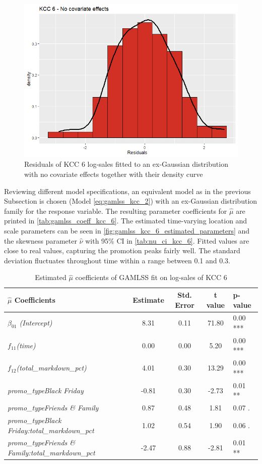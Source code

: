 \begin{figure}[H]
\centering
  \includegraphics[width=0.45\linewidth]{figures/res_kcc_6_no_covariates.png}
  \caption{Residuals of KCC 6 log-sales fitted to an ex-Gaussian distribution with no covariate effects together with their density curve}
  \label{fig:res_kcc_6_no_covariates}
\end{figure}


Reviewing different model specifications, an equivalent model as in the previous Subsection is chosen (Model \ref{eq:gamlss_kcc_2}) with an ex-Gaussian distribution family for the response variable. The resulting parameter coefficients for $\hat{\mu}$ are printed in \autoref{tab:gamlss_coeff_kcc_6}.
The estimated time-varying location and scale parameters can be seen in \autoref{fig:gamlss_kcc_6_estimated_parameters} and the skewness parameter $\hat{\nu}$ with 95\% CI in \autoref{tab:nu_ci_kcc_6}. Fitted values are close to real values, capturing the promotion peaks fairly well. The standard deviation fluctuates throughout time within a range between 0.1 and 0.3.
\\





\begin{table}[H]
\centering
\begin{tabular}{l|c|c|c|l}
  \hline
  \rowcolor{white}
 \textbf{$\hat{\mu}$ Coefficients} & \textbf{Estimate} & \textbf{Std. Error} & \textbf{t value} & \textbf{p-value} \\ 
  \hline\hline
\textit{$\beta_{01}$ (Intercept)} & 8.31 & 0.11 & 71.80 & 0.00 *** \\ 
  \textit{$f_{11}$(time)} & 0.00 & 0.00 & 5.20 & 0.00 *** \\ 
  \textit{$f_{12}$(total\_markdown\_pct)} & 4.01 & 0.30 & 13.29 & 0.00 *** \\ 
  \textit{promo\_typeBlack Friday} & -0.81 & 0.30 & -2.73 & 0.01 ** \\ 
  \textit{promo\_typeFriends \& Family} & 0.87 & 0.48 & 1.81 & 0.07 . \\ 
  \textit{promo\_typeBlack Friday:total\_markdown\_pct} & 1.02 & 0.54 & 1.90 & 0.06 . \\ 
  \textit{promo\_typeFriends \& Family:total\_markdown\_pct} & -2.47 & 0.88 & -2.81 & 0.01 ** \\ \hline
\end{tabular}
\caption{Estimated $\hat{\mu}$ coefficients of \ac{GAMLSS} fit on log-sales of \ac{KCC} 6}
\label{tab:gamlss_coeff_kcc_6}
\end{table}





